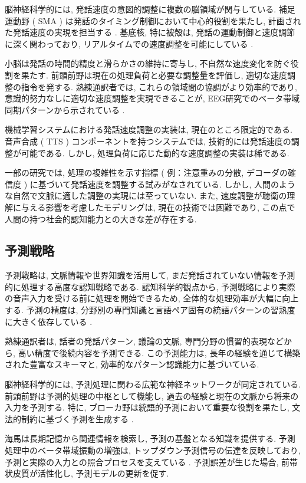 脳神経科学的には, 発話速度の意図的調整に複数の脳領域が関与している.
補足運動野 ( SMA ) は発話のタイミング制御において中心的役割を果たし, 計画された発話速度の実現を担当する \cite{rinne2000left}.
基底核, 特に被殻は, 発話の運動制御と速度調節に深く関わっており, リアルタイムでの速度調整を可能にしている \cite{hervais2015fmri}.

小脳は発話の時間的精度と滑らかさの維持に寄与し, 不自然な速度変化を防ぐ役割を果たす.
前頭前野は現在の処理負荷と必要な調整量を評価し, 適切な速度調整の指令を発する.
熟練通訳者では, これらの領域間の協調がより効率的であり, 意識的努力なしに適切な速度調整を実現できることが, EEG研究でのベータ帯域同期パターンから示されている \cite{yagura2021selective}.

機械学習システムにおける発話速度調整の実装は, 現在のところ限定的である.
音声合成 ( TTS ) コンポーネントを持つシステムでは, 技術的には発話速度の調整が可能である.
しかし, 処理負荷に応じた動的な速度調整の実装は稀である.

一部の研究では, 処理の複雑性を示す指標 ( 例：注意重みの分散, デコーダの確信度 ) に基づいて発話速度を調整する試みがなされている.
しかし, 人間のような自然で文脈に適した調整の実現には至っていない.
また, 速度調整が聴衛の理解に与える影響を考慮したモデリングは, 現在の技術では困難であり, この点で人間の持つ社会的認知能力との大きな差が存在する.

\subsection{予測戦略}

予測戦略は, 文脈情報や世界知識を活用して, まだ発話されていない情報を予測的に処理する高度な認知戦略である.
認知科学的観点から, 予測戦略により実際の音声入力を受ける前に処理を開始できるため, 全体的な処理効率が大幅に向上する.
予測の精度は, 分野別の専門知識と言語ペア固有の統語パターンの習熟度に大きく依存している \cite{seeber2011cognitive}.

熟練通訳者は, 話者の発話パターン, 議論の文脈, 専門分野の慣習的表現などから, 高い精度で後続内容を予測できる.
この予測能力は, 長年の経験を通じて構築された豊富なスキーマと, 効率的なパターン認識能力に基づいている.

脳神経科学的には, 予測処理に関わる広範な神経ネットワークが同定されている.
前頭前野は予測的処理の中枢として機能し, 過去の経験と現在の文脈から将来の入力を予測する.
特に, ブローカ野は統語的予測において重要な役割を果たし, 文法的制約に基づく予測を生成する \cite{rinne2000left}.

海馬は長期記憶から関連情報を検索し, 予測の基盤となる知識を提供する.
予測処理中のベータ帯域振動の増強は, トップダウン予測信号の伝達を反映しており, 予測と実際の入力との照合プロセスを支えている \cite{elmer2016functional}.
予測誤差が生じた場合, 前帯状皮質が活性化し, 予測モデルの更新を促す.

